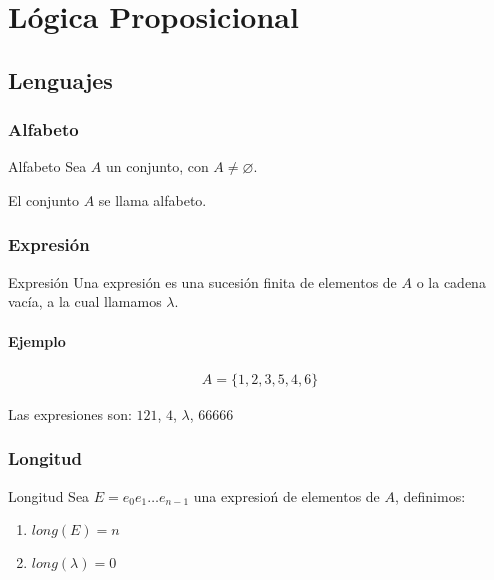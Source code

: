 \chapter{Lógica Proposicional}\label{chap:logica-proposicional}

\section{Lenguajes}
\subsection{Alfabeto}

\begin{definicion}{Alfabeto}{}
    Sea $A$ un conjunto, con $A \neq \varnothing$.

    \medskip

    El conjunto $A$ se llama alfabeto.
\end{definicion}


\subsection{Expresión}

\begin{definicion}{Expresión}{}
    Una expresión es una sucesión finita de elementos de $A$ o la cadena 
    vacía, a la cual llamamos $\lambda$.
\end{definicion}

\subsubsection{Ejemplo}
\begin{gather*}
    A = \{ 1,2,3,5,4,6 \}
\end{gather*}

Las expresiones son: $121$, $4$, $\lambda$, $66666$


\subsection{Longitud}

\begin{definicion}{Longitud}{}
    Sea $E = e_0 e_1 \dots e_{n-1}$ una expresioń de elementos de $A$, 
    definimos:
    \begin{enumerate}
        \item $long(E) = n$
        \item $long(\lambda)=0$
    \end{enumerate}
\end{definicion}

